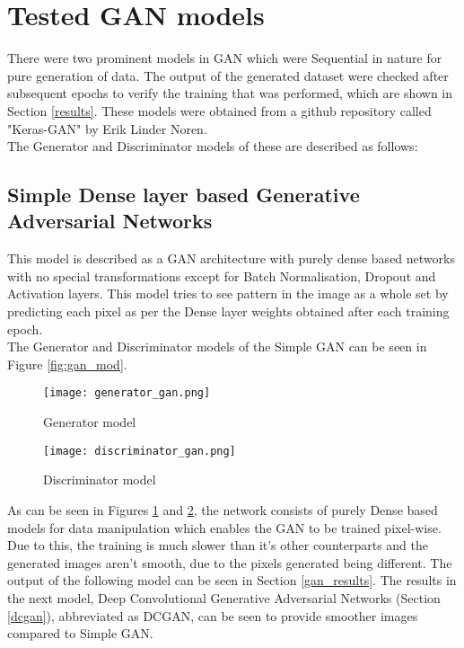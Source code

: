 \documentclass[conference]{IEEEtran}
\begin{document}
\section{Tested GAN models}\label{examples}

There were two prominent models in GAN which were Sequential in nature for pure generation of data. The output of the generated dataset were checked after subsequent epochs to verify the training that was performed, which are shown in Section \ref{results}. These models were obtained from a github repository called "Keras-GAN" by Erik Linder Noren\cite{kerasgan}.
\\
The Generator and Discriminator models of these are described as follows:

\subsection{Simple Dense layer based Generative Adversarial Networks}

This model is described as a GAN architecture with purely dense based networks with no special transformations except for Batch Normalisation, Dropout and Activation layers. This model tries to see pattern in the image as a whole set by predicting each pixel as per the Dense layer weights obtained after each training epoch. 
\\
The Generator and Discriminator models of the Simple GAN can be seen in Figure \ref{fig:gan_mod}.

\begin{figure*}
     \centering
     \begin{subfigure}[b]{\columnwidth}
         \centering
         \texttt{[image: generator\_gan.png]}
         \caption{Generator model}
         \label{fig:gen_gan}
     \end{subfigure}
     \hfill
     \begin{subfigure}[b]{\columnwidth}
         \centering
         \texttt{[image: discriminator\_gan.png]}
         \caption{Discriminator model}
         \label{fig:dis_gan}
     \end{subfigure}
        \caption{Simple Dense layer based Generative Adversarial Networks}
        \label{fig:gan_mod}
\end{figure*}

As can be seen in Figures \ref{fig:gen_gan} and \ref{fig:dis_gan}, the network consists of purely Dense based models for data manipulation which enables the GAN to be trained pixel-wise. Due to this, the training is much slower than it's other counterparts and the generated images aren't smooth, due to the pixels generated being different. The output of the following model can be seen in Section \ref{gan_results}.
The results in the next model, Deep Convolutional Generative Adversarial Networks (Section \ref{dcgan}), abbreviated as DCGAN, can be seen to provide smoother images compared to Simple GAN. 
\end{document}
